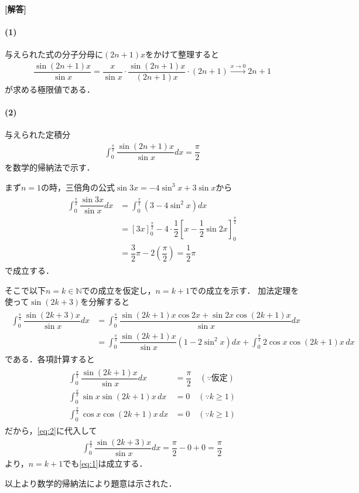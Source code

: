 \documentclass[../../main.tex]{subfiles}
\begin{document}
\begin{oframed}
  
\end{oframed}

{\bf [解答]}
\paragraph{(1)}
与えられた式の分子分母に$(2n+1)x$をかけて整理すると
\begin{align}
  \dfrac{\sin(2n+1)x}{\sin x}=\dfrac{x}{\sin x}\cdot\dfrac{\sin(2n+1)x}{(2n+1)x}\cdot(2n+1)\xrightarrow{x\to0}2n+1
\end{align}
が求める極限値である．

\paragraph{(2)}
与えられた定積分
\begin{align}
  \int_0^{\frac{\pi}{2}}\dfrac{\sin(2n+1)x}{\sin x}dx=\dfrac{\pi}{2} \label{eq:1}
\end{align}
を数学的帰納法で示す．

まず$n=1$の時，三倍角の公式$\sin 3x = -4\sin^3x+3\sin x$から
\begin{align}
  \begin{split}
    \int_0^{\frac{\pi}{2}}\dfrac{\sin3x}{\sin x}dx
    &=\int_0^{\frac{\pi}{2}}(3-4\sin^2x)dx \\
    &=\left[3x\right]_0^{\frac{\pi}{2}}-4\cdot\dfrac{1}{2}\left[x-\dfrac{1}{2}\sin2x\right]_0^{\frac{\pi}{2}} \\
    &=\dfrac{3}{2}\pi-2\left(\dfrac{\pi}{2}\right)=\dfrac{1}{2}\pi
  \end{split}
\end{align}
で成立する．

そこで以下$n=k\in\mathbb{N}$での成立を仮定し，$n=k+1$での成立を示す．
加法定理を使って$\sin(2k+3)$を分解すると
\begin{align}
  \begin{split}
    \int_0^{\frac{\pi}{2}}\dfrac{\sin(2k+3)x}{\sin x}dx
    &=\int_0^{\frac{\pi}{2}}\dfrac{\sin(2k+1)x\cos2x+\sin2x\cos(2k+1)x}{\sin x}dx \\
    &=\int_0^{\frac{\pi}{2}}\dfrac{\sin(2k+1)x}{\sin x}(1-2\sin^2x)dx+\int_0^{\frac{\pi}{2}}2\cos x\cos(2k+1)x\,dx
  \end{split} \label{eq:2}
\end{align}
である．各項計算すると
\begin{align}
  \begin{split}
    \int_0^{\frac{\pi}{2}}\dfrac{\sin(2k+1)x}{\sin x}dx&=\dfrac{\pi}{2} \quad(\because\text{仮定}) \\
    \int_0^{\frac{\pi}{2}}\sin x\sin(2k+1)x\,dx&=0 \quad(\because k\ge1) \\
    \int_0^{\frac{\pi}{2}}\cos x\cos(2k+1)x\,dx&=0 \quad(\because k\ge1)
  \end{split}
\end{align}
だから，\cref{eq:2}に代入して
\begin{align}
  \int_0^{\frac{\pi}{2}}\dfrac{\sin(2k+3)x}{\sin x}dx=\dfrac{\pi}{2}-0+0=\dfrac{\pi}{2}
\end{align}
より，$n=k+1$でも\cref{eq:1}は成立する．

以上より数学的帰納法により題意は示された．

\newpage
\end{document}
